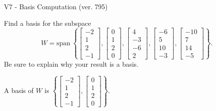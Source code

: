\begin{exercise}
  \begin{exerciseTitle}V7 - Basis Computation (ver. 795)\end{exerciseTitle}
  \begin{exerciseStatement}
    Find a basis for the subspace 
\[W=\mathrm{span}\ \left\{\left[\begin{array}{r}
-2 \\
1 \\
2 \\
-1
\end{array}\right] , \left[\begin{array}{r}
0 \\
1 \\
2 \\
0
\end{array}\right] , \left[\begin{array}{r}
4 \\
-3 \\
-6 \\
2
\end{array}\right] , \left[\begin{array}{r}
-6 \\
5 \\
10 \\
-3
\end{array}\right] , \left[\begin{array}{r}
-10 \\
7 \\
14 \\
-5
\end{array}\right]\right\}.\]
 Be sure to explain why your result is a basis.


  \end{exerciseStatement}
  \begin{exerciseAnswer}
   A basis of \(W\) is  \(\left\{\left[\begin{array}{r}
-2 \\
1 \\
2 \\
-1
\end{array}\right] , \left[\begin{array}{r}
0 \\
1 \\
2 \\
0
\end{array}\right]\right\}\).
  


  \end{exerciseAnswer}
\end{exercise}